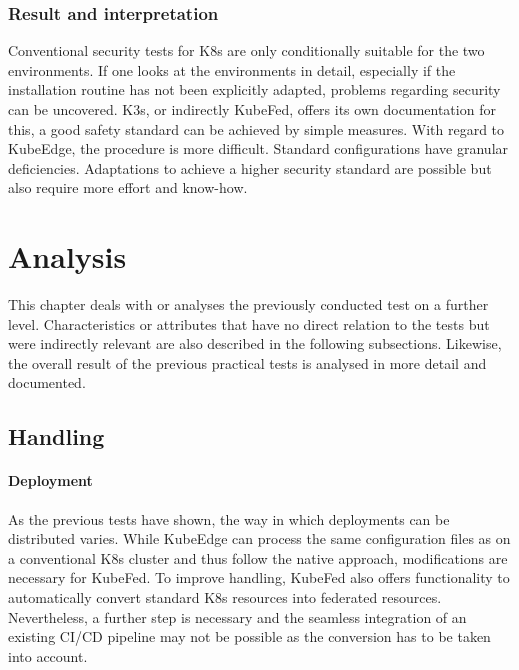 \documentclass[MSC,Master,english]{twbook}%
\begin{document}
\subsubsection{Result and interpretation} Conventional security tests for \ac{K8s} are only conditionally suitable for the two environments. If one looks at the environments in detail, especially if the installation routine has not been explicitly adapted, problems regarding security can be uncovered. K3s, or indirectly KubeFed, offers its own documentation for this, a good safety standard can be achieved by simple measures. With regard to KubeEdge, the procedure is more difficult. Standard configurations have granular deficiencies. Adaptations to achieve a higher security standard are possible but also require more effort and know-how.

\section{Analysis}
\label{sec:dsranalysis}
This chapter deals with or analyses the previously conducted test on a further level. Characteristics or attributes that have no direct relation to the tests but were indirectly relevant are also described  in the following subsections. Likewise, the overall result of the previous practical tests is analysed in more detail and documented.

\subsection{Handling}
\label{sec:handling}
\paragraph{Deployment} As the previous tests have shown, the way in which deployments can be distributed varies. While KubeEdge can process the same configuration files as on a conventional \ac{K8s} cluster and thus follow the native approach, modifications are necessary for KubeFed. To improve handling, KubeFed also offers functionality to automatically convert standard \ac{K8s} resources into federated resources. Nevertheless, a further step is necessary and the seamless integration of an existing CI/CD pipeline may not be possible as the conversion has to be taken into account.
\end{document}
